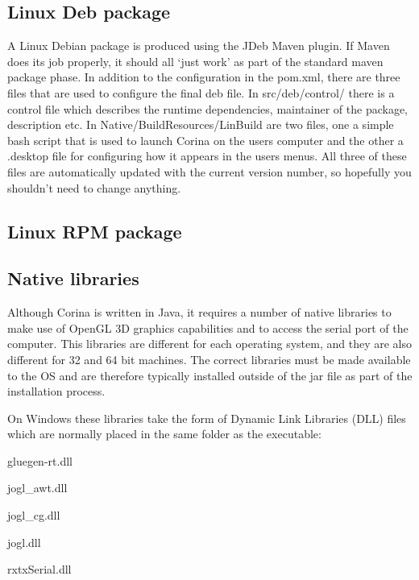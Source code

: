 \subsection{Linux Deb package}
A Linux Debian package is produced using the JDeb Maven plugin.  If Maven does its job properly, it should all `just work' as part of the standard maven package phase.  In addition to the configuration in the pom.xml, there are three files that are used to configure the final deb file.  In src/deb/control/ there is a control file which describes the runtime dependencies, maintainer of the package, description etc.  In Native/BuildResources/LinBuild are two files, one a simple bash script that is used to launch Corina on the users computer and the other a .desktop file for configuring how it appears in the users menus.  All three of these files are automatically updated with the current version number, so hopefully you shouldn't need to change anything. 


\subsection{Linux RPM package}

\subsection{Native libraries}
\label{txt:NativeLibraries}
Although Corina is written in Java, it requires a number of native libraries to make use of OpenGL 3D graphics capabilities and to access the serial port of the computer.  This libraries are different for each operating system, and they are also different for 32 and 64 bit machines.  The correct libraries must be made available to the OS and are therefore typically installed outside of the jar file as part of the installation process.  

On Windows these libraries take the form of Dynamic Link Libraries (DLL) files which are normally placed in the same folder as the executable:

\begin{itemize*}
 \item gluegen-rt.dll
 \item jogl\_awt.dll
 \item jogl\_cg.dll
 \item jogl.dll
 \item rxtxSerial.dll
\end{itemize*}

